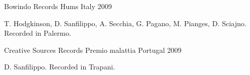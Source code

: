 \begin{cventries}
  \cventry
    {Bowindo Records} %
    {Hums} %
    {Italy} %
    {2009} %
    {
      \begin{cvitems} %
        \item {T. Hodgkinson, D. Sanfilippo, A. Secchia, G. Pagano, M. Pianges, D. Sciajno. Recorded in Palermo.}
      \end{cvitems}
    }

  \cventry
    {Creative Sources Records} %
    {Premio malattia} %
    {Portugal} %
    {2009} %
    {
      \begin{cvitems} %
        \item {D. Sanfilippo. Recorded in Trapani.}
      \end{cvitems}
    }

\end{cventries}
